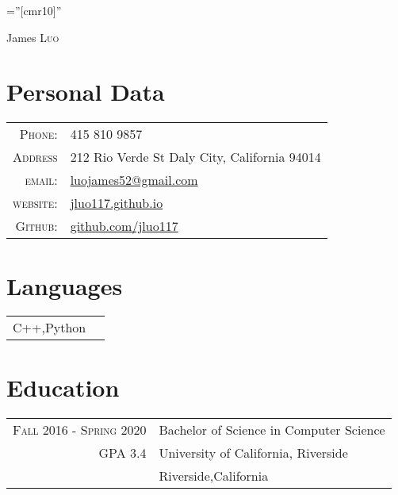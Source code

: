 \documentclass[a4paper,12pt]{article}
\begin{document}

\pagestyle{empty} %

\font\fb=''[cmr10]'' %

\par{\centering
    {\Huge James \textsc{Luo}
  }\bigskip\par}

\section{Personal Data}

\begin{tabular}{rl}
        \textsc{Phone:}     & 415 810 9857\\
        \textsc{Address} & 212 Rio Verde St Daly City, California 94014\\
    \textsc{email:}     & \href{mailto:luojames52@gmail.com}{luojames52@gmail.com}\\
    \textsc{website:} &
    \href{https://jluo117.github.io}{jluo117.github.io}\\
    \textsc{Github:} &
    \href{https://github.com/jluo117}{github.com/jluo117}
\end{tabular}

\section{Languages}
\begin{tabular}{rl}

\textsc{C++},{Python} \\
\end{tabular}

\section{Education}
\begin{tabular}{rl}
\textsc{Fall 2016 - Spring 2020} & Bachelor of Science in Computer Science\\
\textsc{GPA 3.4}
& University of California, Riverside \\
& Riverside,California\\
\end{tabular}
\end{document}
